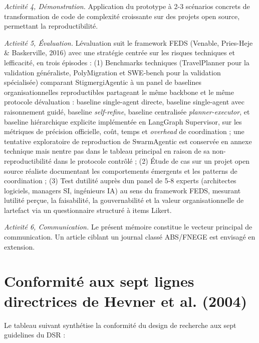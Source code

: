\emph{Activité 4, Démonstration.}
Application du prototype à 2-3 scénarios concrets de transformation de
code de complexité croissante sur des projets open source, permettant
la reproductibilité.

\emph{Activité 5, Évaluation.}
L\textquotesingle évaluation suit le framework FEDS (Venable, Pries-Heje
\& Baskerville, 2016) avec une stratégie centrée sur les risques
techniques et l\textquotesingle efficacité, en trois épisodes :
(1) Benchmarks techniques (TravelPlanner pour la validation généraliste,
PolyMigration et SWE-bench pour la validation spécialisée) comparant
StigmergiAgentic à un panel de baselines organisationnelles
reproductibles partageant le même backbone et le même protocole
d\textquotesingle évaluation : baseline single-agent directe, baseline
single-agent avec raisonnement guidé, baseline \emph{self-refine},
baseline centralisée \emph{planner-executor}, et baseline
hiérarchique explicite implémentée en LangGraph Supervisor, sur les
métriques de précision officielle, coût, temps et \emph{overhead} de
coordination ; une tentative exploratoire de reproduction de
SwarmAgentic est conservée en annexe technique mais n\textquotesingle entre
pas dans le tableau principal en raison de sa non-reproductibilité dans
le protocole contrôlé ;
(2) Étude de cas sur un projet open source réaliste documentant les
comportements émergents et les patterns de coordination ;
(3) Test d\textquotesingle utilité auprès d\textquotesingle un panel de
5-8 experts (architectes logiciels, managers SI, ingénieurs IA) au sens
du framework FEDS, mesurant l\textquotesingle utilité perçue, la
faisabilité, la gouvernabilité et la valeur organisationnelle de
l\textquotesingle artefact via un questionnaire structuré à items
Likert.

\emph{Activité 6, Communication.}
Le présent mémoire constitue le vecteur principal de communication.
Un article ciblant un journal classé ABS/FNEGE est envisagé en
extension.

\section{Conformité aux sept lignes directrices de Hevner et al. (2004)}\label{conformituxe9-aux-sept-guidelines}

Le tableau suivant synthétise la conformité du design de recherche
aux sept guidelines du DSR :

